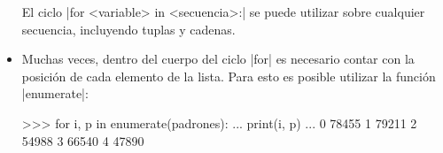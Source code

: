 \begin{itemize}
\begin{observacion}
El ciclo |for <variable> in <secuencia>:| se puede utilizar sobre cualquier
secuencia, incluyendo tuplas y cadenas.
\end{observacion}

\item Muchas veces, dentro del cuerpo del ciclo |for| es necesario contar con la
posición de cada elemento de la lista. Para esto es posible utilizar la función
|enumerate|: \label{enumerate}

\begin{codigo-python-sn}
>>> for i, p in enumerate(padrones):
...     print(i, p)
...
0 78455
1 79211
2 54988
3 66540
4 47890
\end{codigo-python-sn}
\end{itemize}

